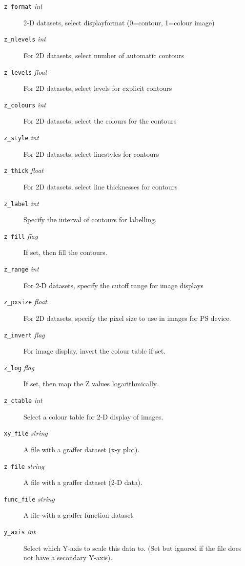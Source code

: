 \documentclass[11pt,twoside,english]{article}
\begin{document}
\begin{description}
\item[\texttt{z\_format} \textit{int}] 2-D datasets, select
  displayformat (0=contour, 1=colour image)

\item[\texttt{z\_nlevels} \textit{int}] For 2D datasets, select number
  of automatic contours

\item[\texttt{z\_levels} \textit{float}] For 2D datasets, select levels
  for explicit contours

\item[\texttt{z\_colours} \textit{int}] For 2D datasets, select the
  colours for the contours

\item[\texttt{z\_style} \textit{int}] For 2D datasets, select
  linestyles for contours

\item[\texttt{z\_thick} \textit{float}] For 2D datasets, select line
  thicknesses for contours

\item[\texttt{z\_label} \textit{int}] Specify the interval of contours
  for labelling.

\item[\texttt{z\_fill} \textit{flag}] If set, then fill the contours.

\item[\texttt{z\_range} \textit{int}] For 2-D datasets, specify the
  cutoff range for image displays

\item[\texttt{z\_pxsize} \textit{float}] For 2D datasets, specify the
  pixel size to use in images for PS device.

\item[\texttt{z\_invert} \textit{flag}] For image display, invert the
  colour table if set.

\item[\texttt{z\_log} \textit{flag}] If set, then map the Z values
  logarithmically.
\item[\texttt{z\_ctable} \textit{int}] Select a colour table for 2-D
  display of images.
\item[\texttt{xy\_file} \textit{string}] A file with a graffer dataset
  (x-y plot).
\item[\texttt{z\_file} \textit{string}] A file with a graffer dataset
  (2-D data).
\item[\texttt{func\_file} \textit{string}] A file with a graffer
  function dataset.
\item[\texttt{y\_axis} \textit{int}] Select which Y-axis to scale this
  data to. (Set but ignored if the file does not have a secondary
  Y-axis).
\end{description}
\end{document}
